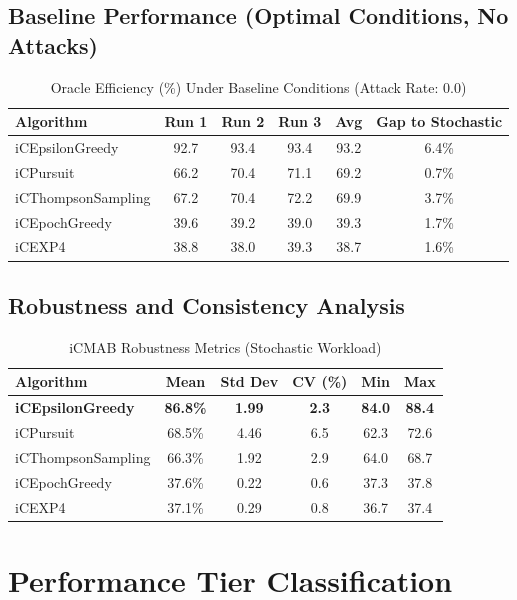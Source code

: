 \documentclass[12pt,a4paper]{article}
\newcommand{\success}[1]{\textcolor{accentgreen}{\textbf{#1}}}
\begin{document}
\subsection{Baseline Performance (Optimal Conditions, No Attacks)}
\begin{table}[H]
\centering
\caption{Oracle Efficiency (\%) Under Baseline Conditions (Attack Rate: 0.0)}
\begin{tabular}{@{}lccccc@{}}
\toprule
\textbf{Algorithm} & \textbf{Run 1} & \textbf{Run 2} & \textbf{Run 3} & \textbf{Avg} & \textbf{Gap to Stochastic} \\
\midrule
iCEpsilonGreedy & 92.7 & 93.4 & 93.4 & 93.2 & 6.4\% \\
iCPursuit & 66.2 & 70.4 & 71.1 & 69.2 & 0.7\% \\
iCThompsonSampling & 67.2 & 70.4 & 72.2 & 69.9 & 3.7\% \\
iCEpochGreedy & 39.6 & 39.2 & 39.0 & 39.3 & 1.7\% \\
iCEXP4 & 38.8 & 38.0 & 39.3 & 38.7 & 1.6\% \\
\bottomrule
\end{tabular}
\end{table}

\subsection{Robustness and Consistency Analysis}
\begin{table}[H]
\centering
\caption{iCMAB Robustness Metrics (Stochastic Workload)}
\begin{tabular}{@{}lccccc@{}}
\toprule
\textbf{Algorithm} & \textbf{Mean} & \textbf{Std Dev} & \textbf{CV (\%)} & \textbf{Min} & \textbf{Max} \\
\midrule
\success{iCEpsilonGreedy} & \success{86.8\%} & \success{1.99} & \success{2.3} & \success{84.0} & \success{88.4} \\
iCPursuit & 68.5\% & 4.46 & 6.5 & 62.3 & 72.6 \\
iCThompsonSampling & 66.3\% & 1.92 & 2.9 & 64.0 & 68.7 \\
iCEpochGreedy & 37.6\% & 0.22 & 0.6 & 37.3 & 37.8 \\
iCEXP4 & 37.1\% & 0.29 & 0.8 & 36.7 & 37.4 \\
\bottomrule
\end{tabular}
\end{table}

\section{Performance Tier Classification}
\end{document}
